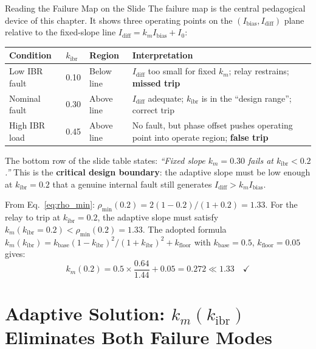 \documentclass[12pt,a4paper]{article}
\newcommand{\kibr}{k_\mathrm{ibr}}
\newcommand{\Idiff}{I_\mathrm{diff}}
\newcommand{\Ibias}{I_\mathrm{bias}}
\newcommand{\km}{k_m}
\newcommand{\Izero}{I_0}
\begin{document}
\begin{archbox}{Reading the Failure Map on the Slide}
The failure map is the central pedagogical device of this chapter.  It shows three
operating points on the $(\Ibias, \Idiff)$ plane relative to the fixed-slope line
$\Idiff = \km\Ibias + \Izero$:

\begin{center}
\begin{tabular}{@{}lllp{5cm}@{}}
\toprule
\textbf{Condition} & \textbf{$\kibr$} & \textbf{Region} & \textbf{Interpretation} \\
\midrule
Low IBR fault   & 0.10 & Below line & $\Idiff$ too small for fixed $\km$; relay restrains;
                                       \textcolor{alertred}{\textbf{missed trip}} \\
Nominal fault   & 0.30 & Above line & $\Idiff$ adequate; $\kibr$ is in the ``design range'';
                                       \textcolor{alertgreen}{correct trip} \\
High IBR load   & 0.45 & Above line & No fault, but phase offset pushes operating point into
                                       operate region; \textcolor{alertorange}{\textbf{false trip}} \\
\bottomrule
\end{tabular}
\end{center}

\medskip
The bottom row of the slide table states:
\emph{``Fixed slope $\km = 0.30$ fails at $\kibr < 0.2$.''} This is the
\textbf{critical design boundary}: the adaptive slope must be low enough at
$\kibr = 0.2$ that a genuine internal fault still generates $\Idiff > \km\Ibias$.

From Eq.~\eqref{eq:rho_min}: $\rho_\mathrm{min}(0.2) = 2(1-0.2)/(1+0.2) = 1.33$.
For the relay to trip at $\kibr = 0.2$, the adaptive slope must satisfy
$\km(\kibr=0.2) < \rho_\mathrm{min}(0.2) = 1.33$.  The adopted formula
$\km(\kibr) = k_\mathrm{base}(1-\kibr)^2/(1+\kibr)^2 + k_\mathrm{floor}$ with
$k_\mathrm{base} = 0.5$, $k_\mathrm{floor} = 0.05$ gives:
\begin{equation}
  \km(0.2) = 0.5 \times \frac{0.64}{1.44} + 0.05 = 0.272 \ll 1.33 \quad \checkmark
\end{equation}
\end{archbox}

\section{Adaptive Solution: $k_m(\kibr)$ Eliminates Both Failure Modes}
\end{document}
